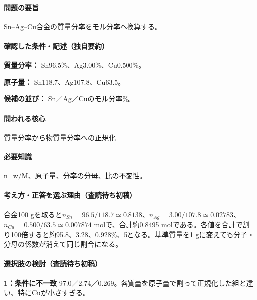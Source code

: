 \paragraph{問題の要旨} Sn–Ag–Cu合金の質量分率をモル分率へ換算する。

\paragraph{確認した条件・記述（独自要約）}\mbox{}\par

\noindent\textbf{質量分率：} Sn96.5\%、Ag3.00\%、Cu0.500\%。\par

\noindent\textbf{原子量：} Sn118.7、Ag107.8、Cu63.5。\par

\noindent\textbf{候補の並び：} Sn／Ag／Cuのモル分率\%。\par

\paragraph{問われる核心} 質量分率から物質量分率への正規化

\paragraph{必要知識} n=\allowbreak{}w/M、原子量、分率の分母、比の不変性。

\paragraph{考え方・正答を選ぶ理由（査読待ち初稿）} 合金100 gを取ると\(n_{Sn}=96.5/118.7\simeq0.8138\)、\(n_{Ag}=3.00/107.8\simeq0.02783\)、\(n_{Cu}=0.500/63.5\simeq0.007874\) molで、合計約0.8495 molである。各値を合計で割り100倍すると約95.8、3.28、0.928\%、5となる。基準質量を1 gに変えても分子・分母の係数が消えて同じ割合になる。

\paragraph{選択肢の検討（査読待ち初稿）}\mbox{}\par

\noindent\textbf{1：条件に不一致} 97.0／2.74／0.269。各質量を原子量で割って正規化した組と違い、特にCuが小さすぎる。\par

